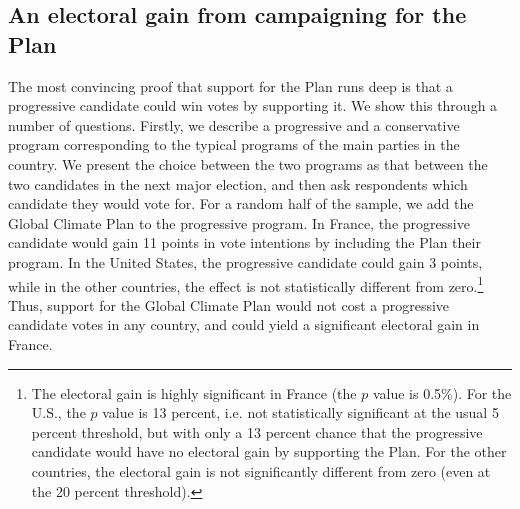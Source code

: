 \documentclass[a5paper,english,openany]{memoir}
\begin{document}
\subsection*{An electoral gain from campaigning for the Plan}
The most convincing proof that support for the Plan runs deep is that a progressive candidate could win votes by supporting it. We show this through a number of questions. Firstly, %
we describe a progressive and a conservative program corresponding to the typical programs of the main parties in the country. We present the choice between the two programs as that between the two candidates in the next major election, %
and then ask respondents which candidate they would vote for. %
For a random half of the sample, we add the Global Climate Plan to the progressive program. In France, the progressive candidate would gain 11 points in vote intentions by including the Plan their %
program. In the United States, %
the progressive candidate could gain 3 points, while in the other countries, the effect is not statistically different from zero.\footnote{The electoral gain is highly significant in France (the $p$ value is 0.5\%). For the U.S., the $p$ value is 13 percent, i.e. not statistically significant at the usual 5 percent threshold, but with only a 13 percent chance that the progressive candidate would have no electoral gain by supporting the Plan. For the other countries, the electoral gain is not significantly different from zero (even at the 20 percent threshold).} 
Thus, support for the Global Climate Plan would not cost a progressive candidate votes in any country, and could yield a significant electoral gain in France. 
\end{document}
